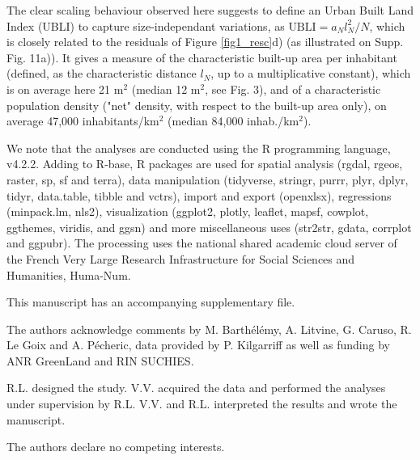 \documentclass[sn-mathphys-num]{sn-jnl}%
\theoremstyle{thmstyleone}%
\theoremstyle{thmstyletwo}%
\theoremstyle{thmstylethree}%
\begin{document}
The clear scaling behaviour observed here suggests to define an Urban Built Land Index (UBLI) to capture size-independant variations, as $\text{UBLI}=a_N l_N^2/N$, which is closely related to the residuals of Figure \ref{fig1_resc}d) (as illustrated on Supp. Fig. 11a)). It gives a measure of the characteristic built-up area per inhabitant (defined, as the characteristic distance $l_N$, up to a multiplicative constant), which is on average here 21 m$^2$ (median 12 m$^2$, see Fig. 3), and of a characteristic population density ("net" density, with respect to the built-up area only), on average 47,000 inhabitants/km$^2$ (median 84,000 inhab./km$^2$). 

We note that the analyses are conducted using the R programming language,  v4.2.2. Adding to R-base, R packages are used for spatial analysis (rgdal, rgeos, raster, sp, sf and terra), data manipulation (tidyverse, stringr, purrr, plyr, dplyr, tidyr, data.table, tibble and vctrs), import and export (openxlsx), regressions (minpack.lm, nls2), visualization (ggplot2, plotly, leaflet, mapsf, cowplot, ggthemes, viridis, and ggsn) and more miscellaneous uses (str2str, gdata, corrplot and ggpubr). The processing uses the national shared academic cloud server of the French Very Large Research Infrastructure for Social Sciences and Humanities, Huma-Num.

\backmatter


This manuscript has an accompanying supplementary file. 


The authors acknowledge comments by M. Barth\'{e}l\'{e}my, A. Litvine, G. Caruso, R. Le Goix and A. P\'{e}cheric, data provided by P. Kilgarriff as well as funding by ANR GreenLand and RIN SUCHIES.


R.L. designed the study. V.V. acquired the data and performed the analyses under supervision by R.L. V.V. and R.L. interpreted the results and wrote the manuscript.

The authors declare no competing interests.

\end{document}
